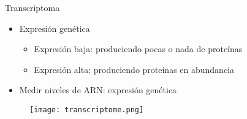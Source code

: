 \documentclass{beamer}
\begin{document}
\begin{frame}{Transcriptoma}
\begin{itemize}
\item Expresión genética 
\begin{itemize}
	\item Expresión baja: produciendo pocas o nada de proteínas
	\item Expresión alta: produciendo proteínas en abundancia
\end{itemize}
\item Medir niveles de ARN: expresión genética
\end{itemize}
\begin{figure}[H]
\centering
\texttt{[image: transcriptome.png]}
\end{figure}
\end{frame}
\end{document}

